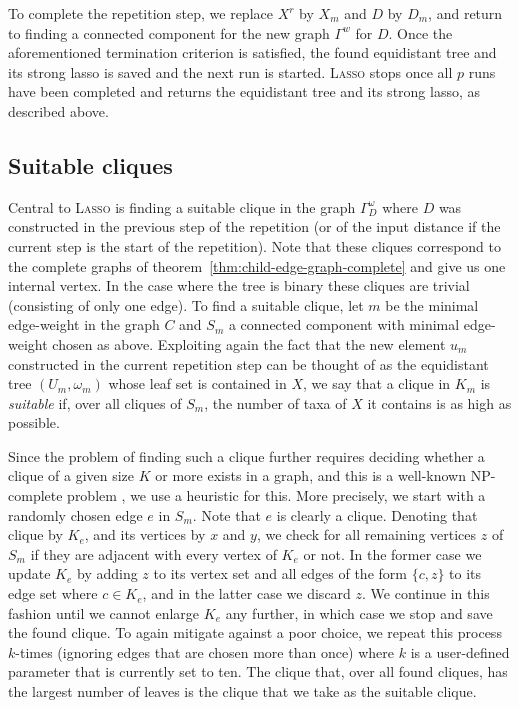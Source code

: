 To complete the repetition step, we replace $X^r$ by $X_m$ and $D$ by $D_m$,
and return to finding a connected component for the new graph $\Gamma^w$ for
$D$. Once the aforementioned termination criterion is satisfied, the found
equidistant tree and its strong lasso is saved and the next run is
started. \textsc{Lasso} stops once all $p$ runs have been completed and returns
the equidistant tree and its strong lasso, as described above.

\subsection{Suitable cliques}
\label{sec:cliques}

Central to \textsc{Lasso} is finding a suitable clique in the graph
$\Gamma^{\omega}_D$ where $D$ was constructed in the previous step of the
repetition (or of the input distance if the current step is the start of the
repetition). Note that these cliques correspond to the complete graphs of
theorem~\ref{thm:child-edge-graph-complete} and give us one internal vertex.
In the case where the tree is binary these cliques are trivial (consisting of
only one edge).  To find a suitable clique, let $m$ be the minimal edge-weight
in the graph $C$ and $S_m$ a connected component with minimal edge-weight
chosen as above.  Exploiting again the fact that the new element $u_m$
constructed in the current repetition step can be thought of as the
equidistant tree $(U_m,\omega_m)$ whose leaf set is contained in $X$, we say
that a clique in $K_m$ is {\em suitable} if, over all cliques of $S_m$, the
number of taxa of $X$ it contains is as high as possible.

Since the problem of finding such a clique further requires deciding whether a
clique of a given size $K$ or more exists in a graph, and this is a well-known
NP-complete problem \cite{gareyjohnson79}, we use a heuristic for this. More
precisely, we start with a randomly chosen edge $e$ in $S_m$. Note that $e$ is
clearly a clique. Denoting that clique by $K_e$, and its vertices by $x$ and
$y$, we check for all remaining vertices $z$ of $S_m$ if they are adjacent
with every vertex of $K_e$ or not. In the former case we update $K_e$ by
adding $z$ to its vertex set and all edges of the form $\{c,z\}$ to its edge
set where $c\in K_e$, and in the latter case we discard $z$.  We continue in
this fashion until we cannot enlarge $K_e$ any further, in which case we stop
and save the found clique. To again mitigate against a poor choice, we repeat
this process $k$-times (ignoring edges that are chosen more than once) where
$k$ is a user-defined parameter that is currently set to ten. The clique that,
over all found cliques, has the largest number of leaves is the clique that we
take as the suitable clique.

